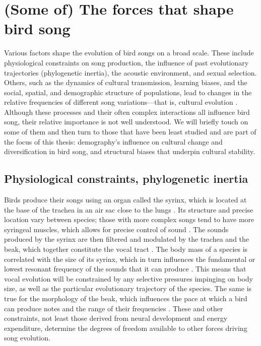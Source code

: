 \section{(Some of) The forces that shape bird song}
Various factors shape the evolution of bird songs on a broad scale. These include physiological constraints on song production, the influence of past evolutionary trajectories (phylogenetic inertia), the acoustic environment, and sexual selection. Others, such as the dynamics of cultural transmission, learning biases, and the social, spatial, and demographic structure of populations, lead to changes in the relative frequencies of different song variations---that is, cultural evolution \autocite{whiten2019}. Although these processes and their often complex interactions all influence bird song, their relative importance is not well understood. We will briefly touch on some of them and then turn to those that have been least studied and are part of the focus of this thesis: demography’s influence on cultural change and diversification in bird song, and structural biases that underpin cultural stability.

\subsection{Physiological constraints, phylogenetic inertia}
Birds produce their songs using an organ called the syrinx, which is located at the base of the trachea in an air sac close to the lungs \autocite{larsen2002a}. Its structure and precise location vary between species; those with more complex songs tend to have more syringeal muscles, which allows for precise control of sound \autocite{suthers2004}. The sounds produced by the syrinx are then filtered and modulated by the trachea and the beak, which together constitute the vocal tract \autocite{podos2004}. The body mass of a species is correlated with the size of its syrinx, which in turn influences the fundamental or lowest resonant frequency of the sounds that it can produce \autocite{martin2011,ryan1985a}. This means that vocal evolution will be constrained by any selective pressures impinging on body size, as well as the particular evolutionary trajectory of the species. The same is true for the morphology of the beak, which influences the pace at which a bird can produce notes and the range of their frequencies \autocite{derryberry2012,derryberry2018,podos2001,seddon2005}. These and other constraints, not least those derived from neural development and energy expenditure, determine the degrees of freedom available to other forces driving song evolution. 

